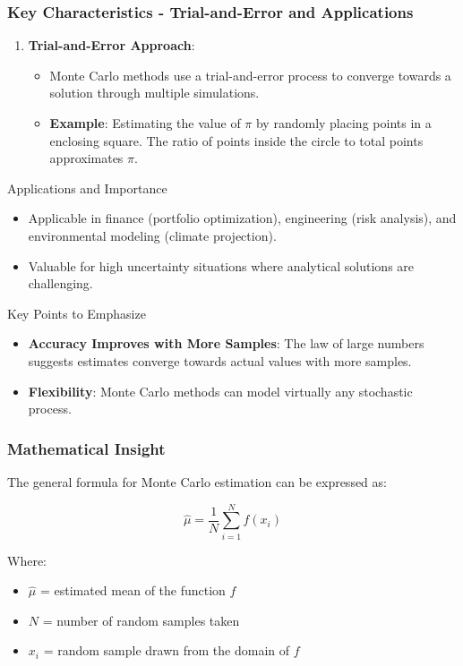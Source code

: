 \documentclass[aspectratio=169]{beamer}
\begin{document}
\begin{frame}[fragile]
    \frametitle{Key Characteristics - Trial-and-Error and Applications}
    \begin{enumerate}[resume]
        \item \textbf{Trial-and-Error Approach}:
        \begin{itemize}
            \item Monte Carlo methods use a trial-and-error process to converge towards a solution through multiple simulations.
            \item \textbf{Example}: Estimating the value of $\pi$ by randomly placing points in a enclosing square. The ratio of points inside the circle to total points approximates $\pi$.
        \end{itemize}
    \end{enumerate}
    
    \begin{block}{Applications and Importance}
        \begin{itemize}
            \item Applicable in finance (portfolio optimization), engineering (risk analysis), and environmental modeling (climate projection).
            \item Valuable for high uncertainty situations where analytical solutions are challenging.
        \end{itemize}
    \end{block}

    \begin{block}{Key Points to Emphasize}
        \begin{itemize}
            \item \textbf{Accuracy Improves with More Samples}: The law of large numbers suggests estimates converge towards actual values with more samples.
            \item \textbf{Flexibility}: Monte Carlo methods can model virtually any stochastic process.
        \end{itemize}
    \end{block}
\end{frame}

\begin{frame}[fragile]
    \frametitle{Mathematical Insight}
    The general formula for Monte Carlo estimation can be expressed as:

    \begin{equation}
        \hat{\mu} = \frac{1}{N} \sum_{i=1}^{N} f(x_i)
    \end{equation}

    Where:
    \begin{itemize}
        \item \( \hat{\mu} \) = estimated mean of the function \( f \)
        \item \( N \) = number of random samples taken
        \item \( x_i \) = random sample drawn from the domain of \( f \)
    \end{itemize}
\end{frame}
\end{document}
